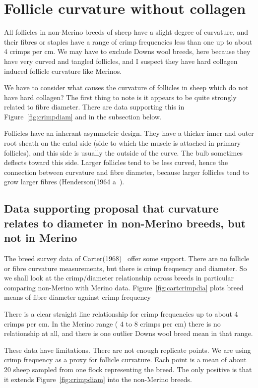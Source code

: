\documentclass{article}
\begin{document}
\section{Follicle curvature without collagen}
All follicles in non-Merino breeds of sheep have a slight degree of curvature, and their fibres or staples have a range of crimp frequencies less than one up to about 4 crimps per cm.  We may have to exclude Downs wool breeds, here because they have very curved and tangled follicles, and I suspect they have hard collagen induced follicle curvature like Merinos.

We have to consider what causes the curvature of follicles in sheep which do not have hard collagen? The first thing to note is it appears to be quite strongly related to fibre diameter. There are data supporting this in Figure~\ref{fig:crimpdiam} and in the subsection below.

Follicles have an inherant asymmetric design.  They have a thicker inner and outer root sheath on the ental side (side to which the muscle is attached in primary follicles), and this side is usually the outside of the curve. The bulb sometimes deflects toward this side.   Larger follicles tend to be less curved, hence the connection between curvature and fibre diameter, because larger follicles tend to grow larger fibres (Henderson(1964 a~\cite{henderson-1964}).

\subsection{Data supporting proposal that curvature relates to diameter in non-Merino breeds, but not in Merino}
The breed survey data of Carter(1968)~\cite{carter-1968} offer some support. There are no follicle or fibre curvature measurements, but there is crimp frequency and diameter. So we shall look at the crimp/diameter relationship  across breeds in particular comparing non-Merino with Merino data. Figure~\ref{fig:cartcrimpdia} plots breed means of fibre diameter against crimp frequency

There is a clear straight line relationship for crimp frequencies up to about 4 crimps per cm. In the Merino range ( 4 to 8 crimps per cm) there is no relationship at all, and there is one outlier Downs wool breed mean in that range. 

These data have limitations. There are not enough replicate points. We are using crimp frequency as a proxy for follicle curvature. Each point is a mean of about 20 sheep sampled from one flock representing the breed. The only positive is that it extends Figure~\ref{fig:crimpdiam} into the non-Merino breeds.
\end{document}

